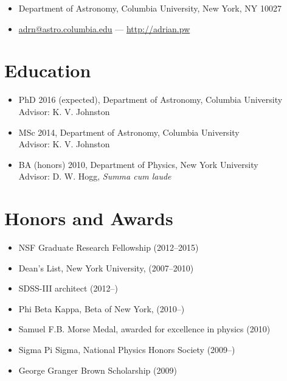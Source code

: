 \documentclass[12pt,letterpaper]{article}
\begin{document}
\thispagestyle{empty}\sloppy\sloppypar

{\huge \name}

\begin{itemize}
  \item Department of Astronomy, Columbia University, New York, NY 10027
  \item \href{mailto:adrn@astro.columbia.edu}{adrn@astro.columbia.edu} --- 
		\href{http://adrian.pw}{http://adrian.pw}
\end{itemize}

\section*{Education}
	\begin{itemize}
	\item PhD 2016 (expected), Department of Astronomy, Columbia University\\
		{Advisor: K. V. Johnston}
	\item MSc 2014, Department of Astronomy, Columbia University\\
		{Advisor: K. V. Johnston}
	\item BA (honors) 2010, Department of Physics, New York University\\ 
		{Advisor: D. W. Hogg, \emph{Summa cum laude}}
	\end{itemize}

\section*{Honors and Awards}
	\begin{itemize}
	\item NSF Graduate Research Fellowship (2012--2015)
	\item Dean's List, New York University, (2007--2010)
	\item SDSS-III architect (2012--)
	\item Phi Beta Kappa, Beta of New York, (2010--)
	\item Samuel F.B. Morse Medal, awarded for excellence in physics (2010)
	\item Sigma Pi Sigma, National Physics Honors Society (2009--)
	\item George Granger Brown Scholarship (2009)
	\end{itemize}
\end{document}
